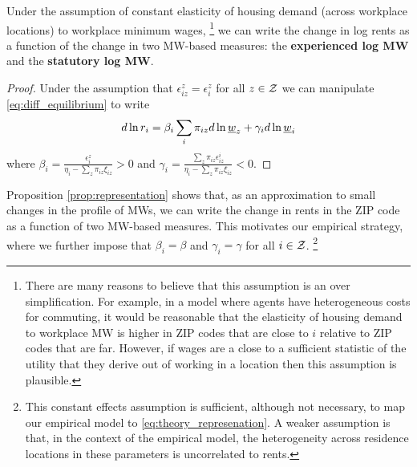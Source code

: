 \begin{prop}[Representation]\label{prop:representation}
    Under the assumption of constant elasticity of housing demand (across workplace locations)
    to workplace minimum wages, %
      \footnote{There are many reasons to believe that this assumption is an over simplification. 
      For example, in a model where agents have heterogeneous costs for commuting, it would be 
      reasonable that the elasticity of housing demand to workplace MW is higher in ZIP codes that 
      are close to $i$ relative to ZIP codes that are far. However, if wages are a close to a sufficient 
      statistic of the utility that they derive out of working in a location then this assumption is plausible.}
    we can write the change in log rents as a function of the change in two 
    MW-based measures: the \textbf{experienced log MW} and the \textbf{statutory 
    log MW}.
\end{prop}
\begin{proof}
    Under the assumption that $\epsilon_{iz}^z = \epsilon_i^z$ for all $z\in\mathcal{Z}$ we can 
    manipulate \eqref{eq:diff_equilibrium} to write
    \begin{equation} \label{eq:theory_represenation}
        d \ln r_i = \beta_i \sum_i \pi_{iz} d\ln \underline{w}_z + \gamma_i d \ln \underline{w}_i
    \end{equation}
    where $\beta_i = \frac{\epsilon_{i}^z}{\eta_{i} - \sum_z \pi_{iz} \xi_{iz}} 
    >0$ and $\gamma_i = \frac{\sum_z \pi_{iz} \epsilon_{iz}^i}{\eta_{i} 
            - \sum_z \pi_{iz} \xi_{iz}} < 0$.
\end{proof}

Proposition \ref{prop:representation} shows that, as an approximation to small changes 
in the profile of MWs, we can write the change in rents in the ZIP code as a function 
of two MW-based measures.
This motivates our empirical strategy, where we further impose that $\beta_i = \beta$ and 
$\gamma_i=\gamma$ for all $i\in\mathcal{Z}$.%
\footnote{This constant effects assumption is sufficient, although not necessary, 
to map our empirical model to \eqref{eq:theory_represenation}. 
A weaker assumption is that, in the context of the empirical model, the heterogeneity 
across residence locations in these parameters is uncorrelated to rents.}
